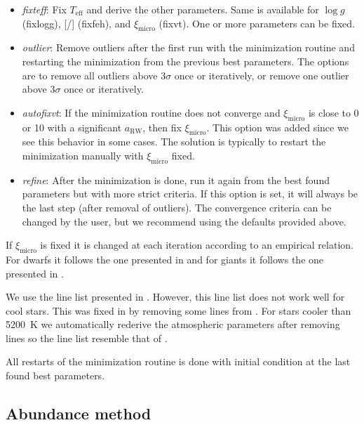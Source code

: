\documentclass{aa}
\begin{document}
\begin{itemize}
    \item \emph{fixteff}: Fix $T_\mathrm{eff}$ and derive the other parameters.
          Same is available for $\log g$ (fixlogg), [/]
          (fixfeh), and $\xi_\mathrm{micro}$ (fixvt). One or more parameters
          can be fixed.
    \item \emph{outlier}: Remove outliers after the first run with the minimization
          routine and restarting the minimization from the previous best
          parameters. The options are to remove all outliers above $3\sigma$
          once or iteratively, or remove one outlier above $3\sigma$ once or
          iteratively.
    \item \emph{autofixvt}: If the minimization routine does not converge and
          $\xi_\mathrm{micro}$ is close to 0 or 10 with a significant
          $a_\mathrm{RW}$, then fix $\xi_\mathrm{micro}$. This option was added
          since we see this behavior in some cases. The solution is typically
          to restart the minimization manually with $\xi_\mathrm{micro}$
          fixed.
    \item \emph{refine}: After the minimization is done, run it again from the best
          found parameters but with more strict criteria. If this option is set,
          it will always be the last step (after removal of outliers). The
          convergence criteria can be changed by the user, but we recommend
          using the defaults provided above.
\end{itemize}
If $\xi_\mathrm{micro}$ is fixed it is changed at each iteration according to
an empirical relation. For dwarfs it follows the one presented in
\citet{Tsantaki2013} and for giants it follows the one presented in
\citet{Adibekyan2015}.

We use the line list presented in \citet{Sousa2008a}. However, this line list
does not work well for cool stars. This was fixed in \citet{Tsantaki2013}
by removing some lines from \citet{Sousa2008a}. For stars cooler than
\SI{5200}{K} we automatically rederive the atmospheric parameters after
removing lines so the line list resemble that of \citet{Tsantaki2013}.

All restarts of the minimization routine is done with initial condition at
the last found best parameters.


\subsection{Abundance method}
\label{sub:Abundance_method}
\end{document}
